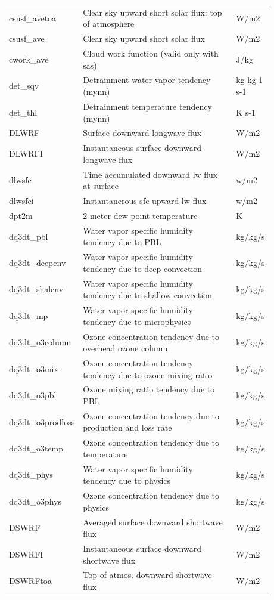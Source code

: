 \documentclass[11pt,fleqn]{report}              %
\begin{document}
\begin{enumerate}
\begin{enumerate}
{\begin{longtable}{p{0.17\linewidth} | p{0.6\linewidth} | p{0.11\linewidth} }
csusf\_avetoa  & Clear sky upward short solar flux: top of atmosphere & W/m2  \\
csusf\_ave  & Clear sky upward short solar flux & W/m2  \\
cwork\_ave  & Cloud work function (valid only with sas) & J/kg  \\
det\_sqv & Detrainment water vapor tendency (mynn) & kg kg-1 s-1 \\
det\_thl & Detrainment temperature tendency (mynn) & K s-1 \\ 
DLWRF & Surface downward longwave flux & W/m2  \\
DLWRFI & Instantaneous surface downward longwave flux & W/m2  \\
dlwsfc & Time accumulated downward lw flux at surface & w/m2  \\
dlwsfci & Instantanerous sfc upward lw flux & w/m2  \\
dpt2m  & 2 meter dew point temperature  & K  \\
dq3dt\_pbl & Water vapor specific humidity tendency due to PBL & kg/kg/s \\
dq3dt\_deepcnv & Water vapor specific humidity tendency due to deep convection & kg/kg/s \\
dq3dt\_shalcnv & Water vapor specific humidity tendency due to shallow convection & kg/kg/s \\
dq3dt\_mp & Water vapor specific humidity tendency due to microphysics &  kg/kg/s \\
dq3dt\_o3column & Ozone concentration tendency due to overhead ozone column &  kg/kg/s \\
dq3dt\_o3mix & Ozone concentration tendency tendency due to ozone mixing ratio &  kg/kg/s \\
dq3dt\_o3pbl & Ozone mixing ratio tendency due to PBL &  kg/kg/s \\
dq3dt\_o3prodloss & Ozone concentration tendency due to production and loss rate &  kg/kg/s \\
dq3dt\_o3temp & Ozone concentration tendency due to temperature &  kg/kg/s \\
dq3dt\_phys & Water vapor specific humidity tendency due to physics & kg/kg/s \\
dq3dt\_o3phys & Ozone concentration tendency due to physics &  kg/kg/s \\
DSWRF  & Averaged surface downward shortwave flux & W/m2 \\
DSWRFI  & Instantaneous surface downward shortwave flux & W/m2 \\
DSWRFtoa  & Top of atmos. downward shortwave flux & W/m2  \\

\end{longtable}}
\end{enumerate}
\end{enumerate}
\end{document}
